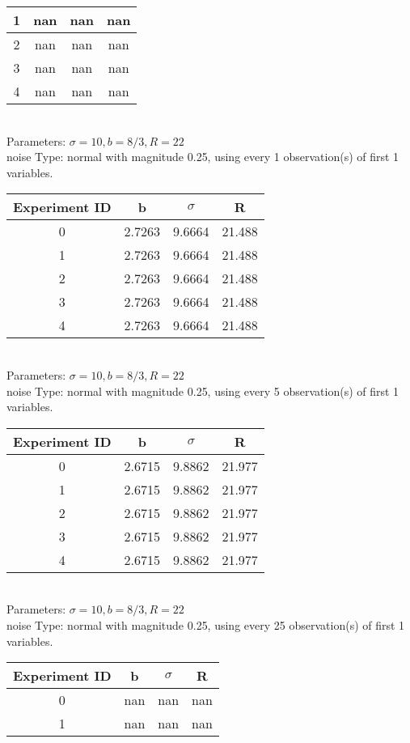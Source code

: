 \begin{multicols}{3}
\begin{tabular}{cccc}
 1 & nan & nan & nan\\ \hline 
 2 & nan & nan & nan\\ \hline 
 3 & nan & nan & nan\\ \hline 
 4 & nan & nan & nan\\ \hline 
 \end{tabular}\\
Parameters: $\sigma=10, b=8/3, R=22$\\
noise Type: normal with magnitude 0.25, using every 1 observation(s) of first 1 variables.\\
\begin{tabular}{cccc}
\hline Experiment ID & b & $\sigma$ & R \\ \hline 
0 & 2.7263 & 9.6664 & 21.488\\ \hline 
 1 & 2.7263 & 9.6664 & 21.488\\ \hline 
 2 & 2.7263 & 9.6664 & 21.488\\ \hline 
 3 & 2.7263 & 9.6664 & 21.488\\ \hline 
 4 & 2.7263 & 9.6664 & 21.488\\ \hline 
 \end{tabular}\\
Parameters: $\sigma=10, b=8/3, R=22$\\
noise Type: normal with magnitude 0.25, using every 5 observation(s) of first 1 variables.\\
\begin{tabular}{cccc}
\hline Experiment ID & b & $\sigma$ & R \\ \hline 
0 & 2.6715 & 9.8862 & 21.977\\ \hline 
 1 & 2.6715 & 9.8862 & 21.977\\ \hline 
 2 & 2.6715 & 9.8862 & 21.977\\ \hline 
 3 & 2.6715 & 9.8862 & 21.977\\ \hline 
 4 & 2.6715 & 9.8862 & 21.977\\ \hline 
 \end{tabular}\\
Parameters: $\sigma=10, b=8/3, R=22$\\
noise Type: normal with magnitude 0.25, using every 25 observation(s) of first 1 variables.\\
\begin{tabular}{cccc}
\hline Experiment ID & b & $\sigma$ & R \\ \hline 
0 & nan & nan & nan\\ \hline 
 1 & nan & nan & nan\\ \hline 

\end{tabular}
\end{multicols}
